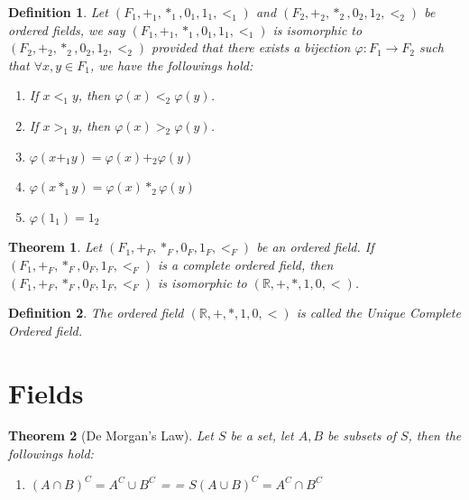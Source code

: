 \documentclass[11pt]{article}
\makeatletter
\theoremstyle{break}
\theoremstyle{break}
\newtheorem{thm}{Theorem}[section]
\newtheorem{defn}{Definition}[corL]
\newcommand{\R}{\mathbb{R}}
\newcommand{\inlineitem}[1][]{%
\ifnum\enit@type=\tw@
    {\descriptionlabel{#1}}
  \hspace{\labelsep}%
\else
  \ifnum\enit@type=\z@
       \refstepcounter{\@listctr}\fi
    \quad\@itemlabel\hspace{\labelsep}%
\fi}
\makeatother
\begin{document}
	\begin{defn}
		Let $(F_1,+_1,\ast_1,0_1,1_1,<_1)$ and $(F_2,+_2,\ast_2,0_2,1_2,<_2)$ be ordered fields, we say $(F_1,+_1,\ast_1,0_1,1_1,<_1)$ is isomorphic to $(F_2,+_2,\ast_2,0_2,1_2,<_2)$ provided that there exists a bijection $\varphi:F_1 \to F_2$ such that $\forall x,y \in F_1$, we have the followings hold:
		\begin{enumerate}[topsep=3pt,itemsep=-1ex,partopsep=1ex,parsep=1ex]
			\item If $x <_1 y$, then $\varphi(x) <_2 \varphi(y)$.
			\item If $x >_1 y$, then $\varphi(x) >_2 \varphi(y)$.
			\item $\varphi(x +_1 y)=\varphi(x)+_2 \varphi(y)$
			\item $\varphi(x \ast_1 y)=\varphi(x)\ast_2 \varphi(y)$
			\item $\varphi(1_1)=1_2$
		\end{enumerate}
	\end{defn}
	
	\begin{thm}
		Let $(F_1,+_F,\ast_F,0_F,1_F,<_F)$ be an ordered field. If $(F_1,+_F,\ast_F,0_F,1_F,<_F)$ is a complete ordered field, then $(F_1,+_F,\ast_F,0_F,1_F,<_F)$ is isomorphic to $(\R,+,\ast,1,0,<)$.
	\end{thm}
	
	\begin{defn}
		The ordered field $(\R,+,\ast,1,0,<)$ is called the Unique Complete Ordered field.
	\end{defn}
	
\clearpage	
	
	
	
	
	
	
	
	
	
	
	
	
	
	
	
	
	
	
	
	
	
	
	
	
	
	

\section{\color{red} Fields}
	\begin{thm}[De Morgan's Law]
		Let $S$ be a set, let $A,B$ be subsets of $S$, then the followings hold:
		\begin{enumerate}[topsep=3pt,itemsep=-1ex,partopsep=1ex,parsep=1ex]
			\item $(A \cap B)^C = A^C \cup B^C$ \qquad \qquad
			\inlineitem $S (A \cup B)^C = A^C \cap B^C$
		\end{enumerate}			
	\end{thm}
	
\end{document}
